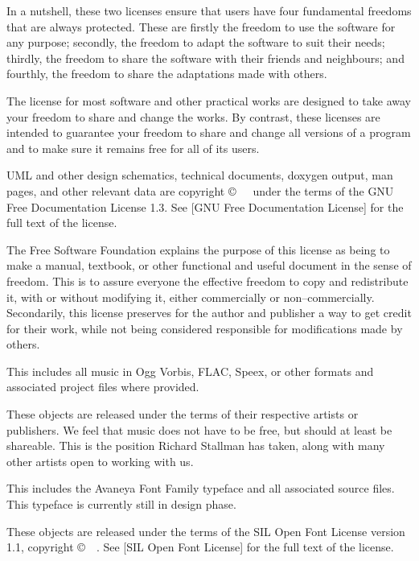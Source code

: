 In a nutshell, these two licenses ensure that users have four fundamental freedoms that are always protected. These are firstly the freedom to use the software for any purpose; secondly, the freedom to adapt the software to suit their needs; thirdly, the freedom to share the software with their friends and neighbours; and fourthly, the freedom to share the adaptations made with others. 

The license for most software and other practical works are designed to take away your freedom to share and change the works. By contrast, these licenses are intended to guarantee your freedom to share and change all versions of a program and to make sure it remains free for all of its users.


UML and other design schematics, technical documents, doxygen output, man pages, and other relevant data are copyright \copyright\ \CopyrightDates\ \CopyrightHolder\ under the terms of the GNU Free Documentation License 1.3. See [GNU Free Documentation License] for the full text of the license.

The Free Software Foundation explains the purpose of this license as being to make a manual, textbook, or other functional and useful document  in the sense of freedom. This is to assure everyone the effective freedom to copy and redistribute it, with or without modifying it, either commercially or non--commercially. Secondarily, this license preserves for the author and publisher a way to get credit for their work, while not being considered responsible for modifications made by others.


This includes all music in Ogg Vorbis, FLAC, Speex, or other formats and associated project files where provided.

These objects are released under the terms of their respective artists or publishers. We feel that music does not have to be free, but should at least be shareable. This is the position Richard Stallman has taken, along with many other artists open to working with us.


This includes the Avaneya Font Family typeface and all associated source files. This typeface is currently still in design phase.

These objects are released under the terms of the SIL Open Font License version 1.1, copyright \copyright\ \CopyrightDates\ \CopyrightHolder. See [SIL Open Font License] for the full text of the license.
\stopitemize

\StopChapter

